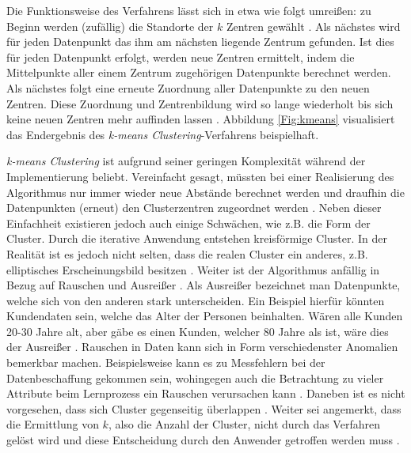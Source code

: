 Die Funktionsweise des Verfahrens lässt sich in etwa wie folgt umreißen: zu Beginn werden (zufällig) die Standorte der $k$ Zentren gewählt \cite{Cleve.2020}. Als nächstes wird für jeden Datenpunkt das ihm am nächsten liegende Zentrum gefunden. Ist dies für jeden Datenpunkt erfolgt, werden neue Zentren ermittelt, indem die Mittelpunkte aller einem Zentrum zugehörigen Datenpunkte berechnet werden. Als nächstes folgt eine erneute Zuordnung aller Datenpunkte zu den neuen Zentren. Diese Zuordnung und Zentrenbildung wird so lange wiederholt bis sich keine neuen Zentren mehr auffinden lassen \cite{Ng.2018}. Abbildung \ref{Fig:kmeans} visualisiert das Endergebnis des \emph{k-means Clustering}-Verfahrens beispielhaft.

 \emph{k-means Clustering} ist aufgrund seiner geringen Komplexität während der Implementierung beliebt. Vereinfacht gesagt, müssten bei einer Realisierung des Algorithmus nur immer wieder neue Abstände berechnet werden und draufhin die Datenpunkten (erneut) den Clusterzentren zugeordnet werden \cite{Cleve.2020}. Neben dieser Einfachheit existieren jedoch auch einige Schwächen, wie z.B. die Form der Cluster. Durch die iterative Anwendung entstehen kreisförmige Cluster. In der Realität ist es jedoch nicht selten, dass die realen Cluster ein anderes, z.B. elliptisches Erscheinungsbild besitzen \cite{Ng.2018}.  Weiter ist der Algorithmus anfällig in Bezug auf Rauschen und Ausreißer \cite{Cleve.2020}. Als Ausreißer bezeichnet man Datenpunkte, welche sich von den anderen stark unterscheiden. Ein Beispiel hierfür könnten Kundendaten sein, welche das Alter der Personen beinhalten. Wären alle Kunden 20-30 Jahre alt, aber gäbe es einen Kunden, welcher 80 Jahre als ist, wäre dies der Ausreißer \cite{Cleve.2020}. Rauschen in Daten kann sich in Form verschiedenster Anomalien bemerkbar machen. Beispielsweise kann es zu Messfehlern bei der Datenbeschaffung gekommen sein, wohingegen auch die Betrachtung zu vieler Attribute beim Lernprozess ein Rauschen verursachen kann \cite{Alpaydin+2019}. Daneben ist es nicht vorgesehen, dass sich Cluster gegenseitig überlappen \cite{Ng.2018}. Weiter sei angemerkt, dass die Ermittlung von $k$, also die Anzahl der Cluster, nicht durch das Verfahren gelöst wird und diese Entscheidung durch den Anwender getroffen werden muss \cite{Cleve.2020}.
 
